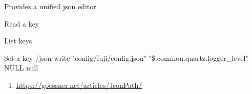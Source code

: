 
Provides a unified json editor.


\begin{example}{Read a key}
\end{example}

\begin{example}{List keys}
\end{example}

\begin{example}{Set a key}
    /json write "config/fuji/config.json" "\$.common.quartz.logger\_level" NULL null
\end{example}

\begin{enumerate}
    \item \url{https://goessner.net/articles/JsonPath/}
\end{enumerate}